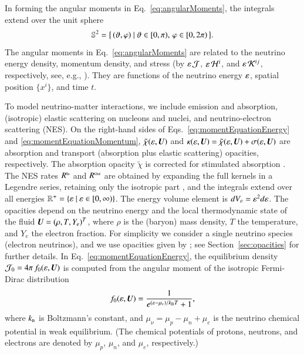 \documentclass[11pt,letterpaper,twoside,english,final]{article}
\begin{document}
In forming the angular moments in Eq.~\eqref{eq:angularMoments}, the integrals extend over the unit sphere
\begin{equation}
  \mathbb{S}^{2}=\big\{\,(\vartheta,\varphi)~|~\vartheta\in[0,\pi),\,\varphi\in[0,2\pi)\,\big\}.  
\end{equation}
The angular moments in Eq.~\eqref{eq:angularMoments} are related to the neutrino energy density, momentum density, and stress (by $\varepsilon\,\mathcal{J}$, $\varepsilon\,\mathcal{H}^{i}$, and $\varepsilon\,\mathcal{K}^{ij}$, respectively, see, e.g., \cite{cardall_etal_2013a}).  
They are functions of the neutrino energy $\varepsilon$, spatial position $\{x^{i}\}$, and time $t$.  

To model neutrino-matter interactions, we include emission and absorption, (isotropic) elastic scattering on nucleons and nuclei, and neutrino-electron scattering (NES).  
On the right-hand sides of Eqs.~\eqref{eq:momentEquationEnergy} and \eqref{eq:momentEquationMomentum}, $\tilde{\chi}(\varepsilon,\boldsymbol{U})$ and $\kappa(\varepsilon,\boldsymbol{U})=\tilde{\chi}(\varepsilon,\boldsymbol{U})+\sigma(\varepsilon,\boldsymbol{U})$ are absorption and transport (absorption plus elastic scattering) opacities, respectively.  
The absorption opacity $\tilde{\chi}$ is corrected for stimulated absorption \citep[cf.][]{mezzacappaBruenn_1993a}.  
The NES rates $R^{\mbox{\tiny In}}$ and $R^{\mbox{\tiny Out}}$ are obtained by expanding the full kernels in a Legendre series, retaining only the isotropic part \citep[see, e.g.,][]{cernohorsky_1994}, and the integrals extend over all energies $\mathbb{R}^{+}=\{\varepsilon~|~\varepsilon\in[0,\infty)\}$.  
The energy volume element is $dV_{\varepsilon}=\varepsilon^{2}d\varepsilon$.  
The opacities depend on the neutrino energy and the local thermodynamic state of the fluid $\boldsymbol{U}=(\rho,T,Y_{e})^{T}$, where $\rho$ is the (baryon) mass density, $T$ the temperature, and $Y_{e}$ the electron fraction.  
For simplicity we consider a single neutrino species (electron neutrinos), and we use opacities given by \citet{bruenn_1985}; see Section~\ref{sec:opacities} for further details.  
In Eq.~\eqref{eq:momentEquationEnergy}, the equilibrium density $\mathcal{J}_{0}=4\pi\,f_{0}(\varepsilon,\boldsymbol{U})$ is computed from the angular moment of the isotropic Fermi-Dirac distribution
\begin{equation}
  f_{0}(\varepsilon,\boldsymbol{U})=\frac{1}{e^{(\varepsilon-\mu_{\nu})/k_{\mbox{\tiny B}}T}+1},
\end{equation}
where $k_{\mbox{\tiny B}}$ is Boltzmann's constant, and $\mu_{\nu}=\mu_{p}-\mu_{n}+\mu_{e}$ is the neutrino chemical potential in weak equilibrium.  
(The chemical potentials of protons, neutrons, and electrons are denoted by $\mu_{p}$, $\mu_{n}$, and $\mu_{e}$, respectively.)
\end{document}

